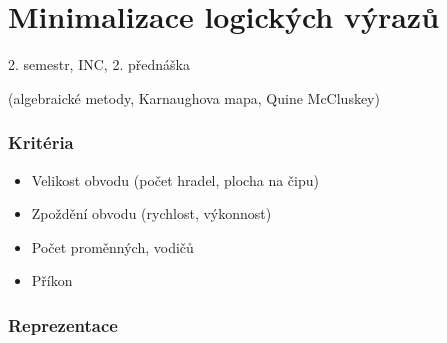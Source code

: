 \documentclass[a4wide]{report}
\begin{document}
\setcounter{chapter}{7}
\chapter{Minimalizace logických výrazů} \label{cha:8}

2. semestr, INC, 2. přednáška

(algebraické metody, Karnaughova mapa, Quine McCluskey)

\subsection{Kritéria}
\begin{itemize}
	\item Velikost obvodu (počet hradel, plocha na čipu)
	\item Zpoždění obvodu (rychlost, výkonnost)
	\item Počet proměnných, vodičů
	\item Příkon
\end{itemize}

\subsection{Reprezentace}
\end{document}
